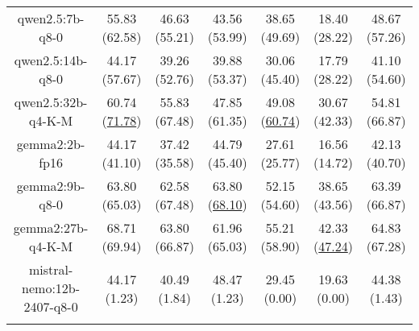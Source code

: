 \begin{table}[hbp]
{\begin{tabular}{ccccccc}
        \multicolumn{1}{c|}{qwen2.5:7b-q8-0} & 55.83 (62.58) & 46.63 (55.21) & \multicolumn{1}{c|}{43.56 (53.99)} & 38.65 (49.69) & \multicolumn{1}{c|}{18.40 (28.22)} & 48.67 (57.26) \\
        

        \multicolumn{1}{c|}{qwen2.5:14b-q8-0} & 44.17 (57.67) & 39.26 (52.76) & \multicolumn{1}{c|}{39.88 (53.37)} & 30.06 (45.40) & \multicolumn{1}{c|}{17.79 (28.22)} & 41.10 (54.60) \\
        

        \multicolumn{1}{c|}{qwen2.5:32b-q4-K-M} & 60.74 (\underline{71.78}) & 55.83 (67.48) & \multicolumn{1}{c|}{47.85 (61.35)} & 49.08 (\underline{60.74}) & \multicolumn{1}{c|}{30.67 (42.33)} & 54.81 (66.87) \\
        

        \multicolumn{1}{c|}{gemma2:2b-fp16} & 44.17 (41.10) & 37.42 (35.58) & \multicolumn{1}{c|}{44.79 (45.40)} & 27.61 (25.77) & \multicolumn{1}{c|}{16.56 (14.72)} & 42.13 (40.70) \\
        

        \multicolumn{1}{c|}{gemma2:9b-q8-0} & 63.80 (65.03) & 62.58 (67.48) & \multicolumn{1}{c|}{63.80 (\underline{68.10})} & 52.15 (54.60) & \multicolumn{1}{c|}{38.65 (43.56)} & 63.39 (66.87) \\
        

        \multicolumn{1}{c|}{gemma2:27b-q4-K-M} & 68.71 (69.94) & 63.80 (66.87) & \multicolumn{1}{c|}{61.96 (65.03)} & 55.21 (58.90) & \multicolumn{1}{c|}{42.33 (\underline{47.24})} & 64.83 (67.28) \\
        

        \multicolumn{1}{c|}{mistral-nemo:12b-2407-q8-0} & 44.17 (1.23) & 40.49 (1.84) & \multicolumn{1}{c|}{48.47 (1.23)} & 29.45 (0.00) & \multicolumn{1}{c|}{19.63 (0.00)} & 44.38 (1.43) \\
        
\\ \hline
\end{tabular}%
}
\end{table}
    